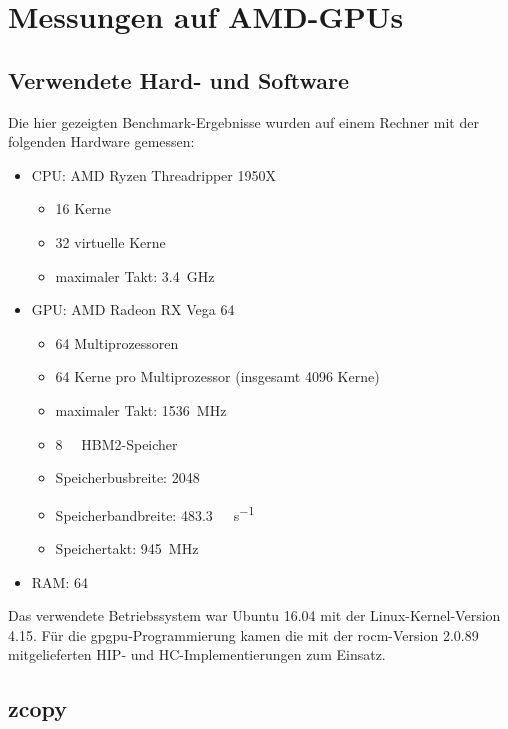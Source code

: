 \section{Messungen auf AMD-GPUs}
\label{amd}

\subsection{Verwendete Hard- und Software}

Die hier gezeigten Benchmark-Ergebnisse wurden auf einem Rechner mit der
folgenden Hardware gemessen:

\begin{itemize}
    \item CPU: AMD Ryzen Threadripper 1950X
          \begin{itemize}
              \item 16 Kerne
              \item 32 virtuelle Kerne
              \item maximaler Takt: \SI{3,4}{\giga\hertz}
          \end{itemize}
    \item GPU: AMD Radeon RX Vega 64
          \begin{itemize}
              \item 64 Multiprozessoren
              \item 64 Kerne pro Multiprozessor (insgesamt \num{4096} Kerne)
              \item maximaler Takt: \SI{1536}{\mega\hertz}
              \item \SI{8}{\gibi\byte} HBM2-Speicher
              \item Speicherbusbreite: \SI{2048}{\bit}
              \item Speicherbandbreite: \SI{483,3}{\gibi\byte\per\second}
              \item Speichertakt: \SI{945}{\mega\hertz}
          \end{itemize}
      \item RAM: \SI{64}{\gibi\byte}
\end{itemize}

Das verwendete Betriebssystem war Ubuntu 16.04 mit der Linux-Kernel-Version
4.15. Für die \gls{gpgpu}-Programmierung kamen die mit der \gls{rocm}-Version
2.0.89 mitgelieferten HIP- und HC-Implementierungen zum Einsatz.

\subsection{zcopy}

